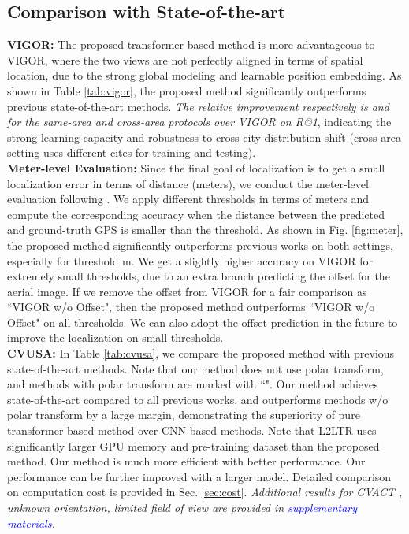 \documentclass[10pt,twocolumn,letterpaper]{article}
\begin{document}
\subsection{Comparison with State-of-the-art}
\label{sec:compare}
\noindent\textbf{VIGOR:} The proposed transformer-based method is more advantageous to VIGOR, where the two views are not perfectly aligned in terms of spatial location, due to the strong global modeling and learnable position embedding. As shown in Table \ref{tab:vigor}, the proposed method significantly outperforms previous state-of-the-art methods. \emph{The relative improvement respectively is  and  for the same-area and cross-area protocols over VIGOR on R@1}, indicating the strong learning capacity and robustness to cross-city distribution shift (cross-area setting uses different cites for training and testing). \\
\textbf{Meter-level Evaluation:} Since the final goal of localization is to get a small localization error in terms of distance (meters), we conduct the meter-level evaluation following \cite{zhu2021vigor}. We apply different thresholds in terms of meters and compute the corresponding accuracy when the distance between the predicted and ground-truth GPS is smaller than the threshold. As shown in Fig. \ref{fig:meter}, the proposed method significantly outperforms previous works on both settings, especially for threshold  m. We get  \cite{zhu2021vigor}  a slightly higher accuracy on VIGOR for extremely small thresholds, due to an extra branch predicting the offset for the aerial image. If we remove the offset  from VIGOR for a fair comparison as ``VIGOR w/o Offset", then the proposed method outperforms ``VIGOR w/o Offset" on all thresholds. We can also adopt the offset prediction in the future to improve the localization on small thresholds.\\
\noindent \textbf{CVUSA:} In Table \ref{tab:cvusa}, we compare the proposed method with previous state-of-the-art methods. Note that our method does not use polar transform, and methods with polar transform are marked with ``\dag". Our method achieves state-of-the-art  compared to all previous works, and outperforms methods w/o polar transform by a large margin, demonstrating the superiority of pure transformer based method over CNN-based methods. Note that L2LTR \cite{yang2021cross} uses significantly larger GPU memory and pre-training dataset than the proposed method. Our method is much more efficient with better performance. Our performance can be further improved with a larger model. Detailed comparison on computation cost is provided in Sec. \ref{sec:cost}. \emph{Additional results for CVACT \cite{liu2019lending}, unknown orientation, limited field of view are provided in \textcolor{blue}{supplementary materials}.}
\end{document}
